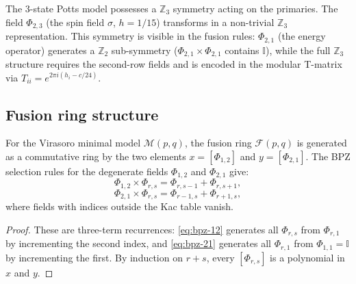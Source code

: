 \begin{remark}\label{rem:z3-symmetry-65}
The $3$-state Potts model possesses a $\mathbb{Z}_3$ symmetry acting on the
primaries. The field $\Phi_{2,3}$ (the spin field $\sigma$, $h = 1/15$) transforms
in a non-trivial $\mathbb{Z}_3$ representation. This symmetry is visible
in the fusion rules: $\Phi_{2,1}$ (the energy operator) generates a
$\mathbb{Z}_2$ sub-symmetry ($\Phi_{2,1}\times\Phi_{2,1}$ contains $\mathbb{I}$),
while the full $\mathbb{Z}_3$ structure requires the second-row fields and
is encoded in the modular T-matrix via $T_{ii} = e^{2\pi i(h_i - c/24)}$.
\end{remark}

\subsection{Fusion ring structure}
\label{subsec:fusion-ring-structure}

\begin{theorem}\label{thm:fusion-ring-generators}
For the Virasoro minimal model $\mathcal{M}(p,q)$, the fusion ring $\mathcal{F}(p,q)$
is generated as a commutative ring by the two elements
$x = [\Phi_{1,2}]$ and $y = [\Phi_{2,1}]$.
The BPZ selection rules for the degenerate fields $\Phi_{1,2}$ and $\Phi_{2,1}$ give:
\begin{equation}\label{eq:bpz-12}
\Phi_{1,2} \times \Phi_{r,s} = \Phi_{r,s-1} + \Phi_{r,s+1},
\end{equation}
\begin{equation}\label{eq:bpz-21}
\Phi_{2,1} \times \Phi_{r,s} = \Phi_{r-1,s} + \Phi_{r+1,s},
\end{equation}
where fields with indices outside the Kac table vanish.
\end{theorem}

\begin{proof}
These are
three-term recurrences: \eqref{eq:bpz-12} generates all $\Phi_{r,s}$
from $\Phi_{r,1}$ by incrementing the second index, and \eqref{eq:bpz-21}
generates all $\Phi_{r,1}$ from $\Phi_{1,1} = \mathbb{I}$ by incrementing
the first. By induction on $r + s$, every $[\Phi_{r,s}]$ is a polynomial
in $x$ and $y$.
\end{proof}

